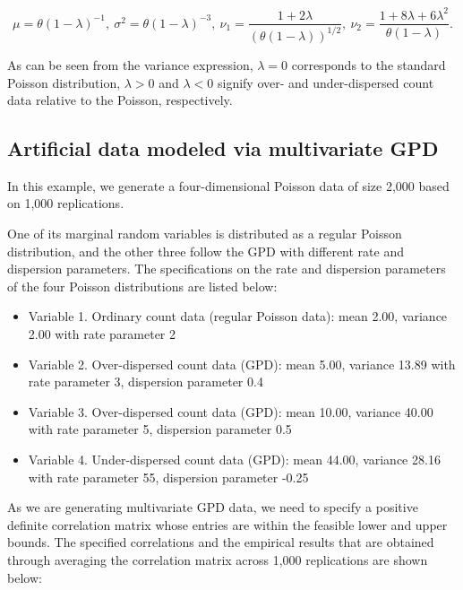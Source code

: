 \begin{equation}
    \mu = \theta\left(1-\lambda\right)^{-1},\ \sigma^2=\theta\left(1-\lambda\right)^{-3}, \  \nu_1=\frac{1+2\lambda}{\left(\theta\left(1-\lambda\right)\right)^{1/2}}, \  \nu_2=\frac{1+8\lambda+6\lambda^2}{\theta\left(1-\lambda\right)}.
\end{equation}

As can be seen from the variance expression, $\lambda = 0$ corresponds to the standard Poisson distribution, $\lambda > 0$ and $\lambda < 0$ signify over- and under-dispersed count data relative to the Poisson, respectively.

\subsection{Artificial data modeled via multivariate GPD}

In this example, we generate a four-dimensional Poisson data of size 2,000 based on 1,000 replications. 

One of its marginal random variables is distributed as a regular Poisson distribution, and the other three follow the GPD with different rate and dispersion parameters. The specifications on the rate and dispersion parameters of the four Poisson distributions are listed below:

\begin{itemize}
    \item Variable 1. Ordinary count data (regular Poisson data): mean 2.00, variance 2.00 with rate parameter 2
    \item Variable 2. Over-dispersed count data (GPD): mean 5.00, variance 13.89 with rate parameter 3, dispersion parameter 0.4
    \item Variable 3. Over-dispersed count data (GPD): mean 10.00, variance 40.00 with rate parameter 5, dispersion parameter 0.5
    \item Variable 4. Under-dispersed count data (GPD): mean 44.00, variance 28.16 with rate parameter 55, dispersion parameter -0.25
\end{itemize}

As we are generating multivariate GPD data, we need to specify a positive definite correlation matrix whose entries are within the feasible lower and upper bounds. The specified correlations and the empirical results that are obtained through averaging the correlation matrix across 1,000 replications are shown below:

